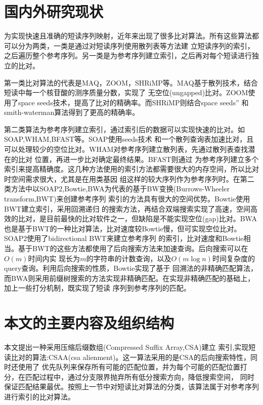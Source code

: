 \section{国内外研究现状}
为实现快速且准确的短读序列映射，近年来出现了很多比对算法。所有这些算法都可以分为两类，一类是通过对短读序列使用散列表等方法建
立短读序列的索引，之后遍历整个参考序列。另一类是为参考序列建立索引，之后再对每个短读进行独立的比对。

第一类比对算法的代表是MAQ，ZOOM，SHRiMP等。MAQ\cite{li2008mapping}基于散列技术，结合短读中每一个核苷酸的测序质量分数，实现了
无空位(ungapped)比对。ZOOM\cite{lin2008zoom}使用了space seeds技术，提高了比对的精确率。而SHRiMP\cite{rumble2009shrimp}则结合space seeds''
和smith-waterman算法得到了更高的精确率。

第二类算法为参考序列建立索引，通过索引后的数据可以实现快速的比对。如SOAP,WHAM,BFAST等。SOAP\cite{li2008soap}使用seeds技术
和一个散列查询表加速比对，且可以处理较少的空位比对。WHAM\cite{li2012wham}对参考序列建立散列表，先通过散列表查找潜在的比对
位置，再进一步比对确定最终结果。BFAST\cite{homer2009bfast}则通过
为参考序列建立多个索引来提高精确度。这几种方法使用的索引方法都需要很大的内存空间，所以比对时空间需求很大，尤其是在用类基因
组这样的较大序列作为参考序列时。在第二类方法中以SOAP2,Bowtie,BWA为代表的基于BW变换(Burrows-Wheeler transform,BWT)\cite{ferragina2005indexing}来创建参考序列
索引的方法具有很大的空间优势。Bowtie\cite{langmead2009ultrafast}使用BWT建立索引，采用回溯递归
的搜索方法，再结合双端搜索实现了高速，空间高效的比对，是目前最快的比对软件之一，但缺陷是不能实现空位(gap)比对。BWA\cite{li2009fast}
也是基于BWT的一种比对算法，比对速度较Bowtie慢，但可实现空位比对。SOAP2\cite{li2009soap2}使用了bidirectional BWT来建立参考序列
的索引，比对速度和Bowtie相当。基于BWT的这些方法都使用了后向搜索方法\cite{lippert2005space}来加速查询。后向搜索可以在$O(m)$时间内实
现长为$m$的字符串的计数查询，以及$O(m\log n)$时间复杂度的query查询。利用后向搜索的性质，Bowtie实现了基于
回溯法的非精确匹配算法，而BWA则采用前缀树搜索的方法实现非精确匹配。在实现非精确匹配的基础上，加上一些打分机制，既实现了短读
序列到参考序列的匹配。

\section{本文的主要内容及组织结构}

本文提出一种采用压缩后缀数组(Compressed Suffix Array,CSA)建立
索引\cite{grossi2005compressed},实现短读比对的算法:CSAA(csa alienment)。这一算法采用的是CSA的后向搜索特性，同时还使用了
优先队列来保存所有可能的匹配位置，并为每个可能的匹配位置打分，在匹配过程中，通过分支限界抛弃所有低分搜索方向，降低搜索空间，
同时保证匹配结果最优。按照上一节中对短读比对算法的分类，该算法属于对参考序列进行索引的比对算法。

